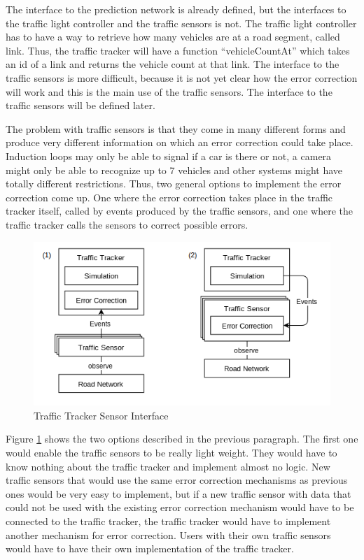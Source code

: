 The interface to the prediction network is already defined, but the interfaces to the traffic light controller and the traffic sensors is not. The traffic light controller has to have a way to retrieve how many vehicles are at a road segment, called link. Thus, the traffic tracker will have a function ``vehicleCountAt'' which takes an id of a link and returns the vehicle count at that link. The interface to the traffic sensors is more difficult, because it is not yet clear how the error correction will work and this is the main use of the traffic sensors. The interface to the traffic sensors will be defined later.

The problem with traffic sensors is that they come in many different forms and produce very different information on which an error correction could take place. Induction loops may only be able to signal if a car is there or not, a camera might only be able to recognize up to 7 vehicles and other systems might have totally different restrictions. Thus, two general options to implement the error correction come up. One where the error correction takes place in the traffic tracker itself, called by events produced by the traffic sensors, and one where the traffic tracker calls the sensors to correct possible errors. 

\begin{figure}[!ht]
  \centering
  \includegraphics[width=14cm]{figures/trackerSensorInterface}
  \caption[Traffic Tracker Sensor Interface]{Traffic Tracker Sensor Interface \protect\footnotemark}
  \label{trafficTrackerSensorInterface}
\end{figure}

Figure \ref{trafficTrackerSensorInterface} shows the two options described in the previous paragraph. The first one would enable the traffic sensors to be really light weight. They would have to know nothing about the traffic tracker and implement almost no logic. New traffic sensors that would use the same error correction mechanisms as previous ones would be very easy to implement, but if a new traffic sensor with data that could not be used with the existing error correction mechanism would have to be connected to the traffic tracker, the traffic tracker would have to implement another mechanism for error correction. Users with their own traffic sensors would have to have their own implementation of the traffic tracker.

